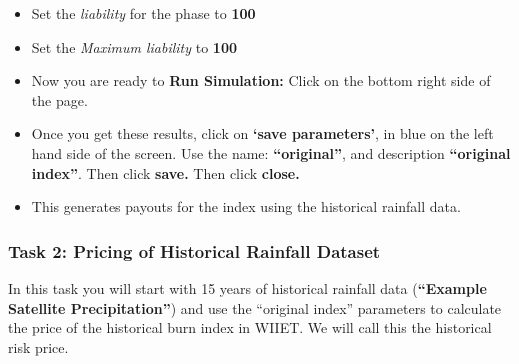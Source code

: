 \documentclass[letterpaper,10pt,english]{sphinxmanual}
\begin{document}
\begin{enumerate}
\begin{itemize}
\item {} 
Set the \emph{liability} for the phase to \textbf{100}

\item {} 
Set the \emph{Maximum liability} to \textbf{100}

\item {} 
Now you are ready to \textbf{Run Simulation:} Click on the bottom right side of the page.

\item {} 
Once you get these results, click on \textbf{`save parameters'}, in blue on the left hand side of the screen. Use the name: \textbf{``original''}, and description \textbf{``original index''}. Then click \textbf{save.} Then click \textbf{close.}

\item {} 
This generates payouts for the index using the historical rainfall data.

\end{itemize}

\end{enumerate}


\subsubsection{Task 2: Pricing of Historical Rainfall Dataset}
\label{wiiet/wiiet_initialtomarketpricing_Web:task-2-pricing-of-historical-rainfall-dataset}
In this task you will start with 15 years of historical rainfall data (\textbf{``Example Satellite Precipitation''}) and use the ``original index'' parameters to calculate the price of the historical burn index in WIIET. We will call this the historical risk price.
\end{document}
